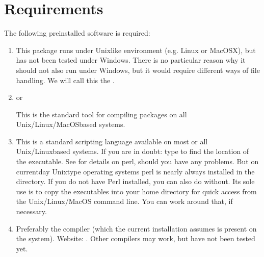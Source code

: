 \documentclass[letterpaper,10pt,english]{sphinxmanual}
\begin{document}
\section{Requirements}
\label{\detokenize{overview:requirements}}\label{\detokenize{overview:sec-requirements}}
The following pre\sphinxhyphen{}installed software is required:
\begin{enumerate}
%
\item {} 

This package runs under Unix\sphinxhyphen{}like environment (e.g. Linux or MacOSX), but has
not been tested under Windows. There is no particular reason why it should not
also run under Windows, but it would require different ways of file
handling.  We will
call this the .

\item {} 
 or 

This is the standard tool for compiling packages on all Unix/Linux/MacOS\sphinxhyphen{}based
systems.

\item {} 

This is a standard scripting language available on most or all
Unix/Linux\sphinxhyphen{}based systems. If you are in doubt: type 
to find the location of the  executable. See 
for details on perl, should you have any
problems. But on current\sphinxhyphen{}day Unix\sphinxhyphen{}type operating systems perl is nearly
always installed in the  directory. If you do not
have Perl installed, you can also do without. Its sole use is to copy
the executables into your home  directory for quick
access from the Unix/Linux/MacOS command line. You can work around that,
if necessary.

\item {} 

Preferably the  compiler (which the current
installation assumes is present on the system). Website:
. Other compilers may work, but have not
been tested yet.


\end{enumerate}
\end{document}
